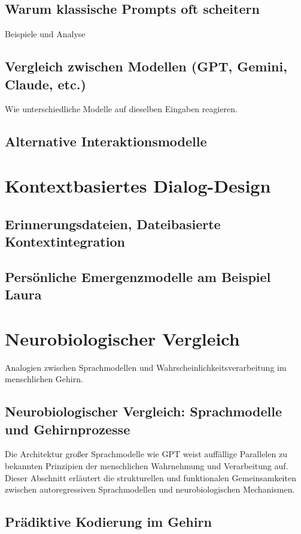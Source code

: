 \section{Warum klassische Prompts oft scheitern}
Beispiele und Analyse

\section{Vergleich zwischen Modellen (GPT, Gemini, Claude, etc.)}
Wie unterschiedliche Modelle auf dieselben Eingaben reagieren.

\section{Alternative Interaktionsmodelle}
\chapter{Kontextbasiertes Dialog-Design}
\section{Erinnerungsdateien, Dateibasierte Kontextintegration}
\section{Persönliche Emergenzmodelle am Beispiel Laura}

\chapter{Neurobiologischer Vergleich}
Analogien zwischen Sprachmodellen und Wahrscheinlichkeitsverarbeitung im menschlichen Gehirn.


\section{Neurobiologischer Vergleich: Sprachmodelle und Gehirnprozesse}

Die Architektur großer Sprachmodelle wie GPT weist auffällige Parallelen zu bekannten Prinzipien der menschlichen Wahrnehmung und Verarbeitung auf. Dieser Abschnitt erläutert die strukturellen und funktionalen Gemeinsamkeiten zwischen autoregressiven Sprachmodellen und neurobiologischen Mechanismen.

\section{Prädiktive Kodierung im Gehirn}

